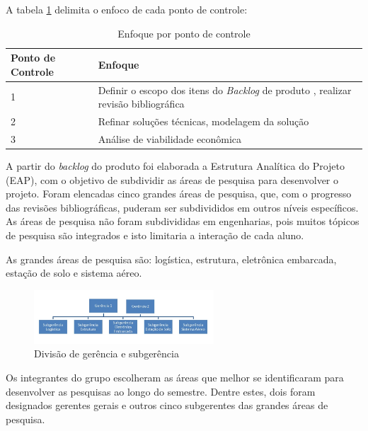   A tabela \ref{tab:enfoque_pc} delimita o enfoco de cada ponto de controle:

  \begin{table}[H]
  \centering
  \begin{tabular}{|p{4cm}|p{12cm}|}
  \hline
  Ponto de Controle & Enfoque                                                                                      \\ \hline
  1                 & Definir o escopo dos itens do \textit{Backlog} de produto , realizar revisão bibliográfica \\ \hline
  2                 & Refinar soluções técnicas, modelagem da solução                                              \\ \hline
  3                 & Análise de viabilidade econômica                                                             \\ \hline
  \end{tabular}
  \caption{Enfoque por ponto de controle}
  \label{tab:enfoque_pc}
  \end{table}

	A partir do \emph{backlog} do produto foi elaborada a Estrutura Analítica do Projeto (EAP), com o objetivo de subdividir as áreas de pesquisa para desenvolver o projeto. Foram elencadas cinco grandes áreas de pesquisa, que, com o progresso das revisões bibliográficas, puderam ser subdivididos em outros níveis específicos. As áreas de pesquisa não foram subdivididas em engenharias, pois muitos tópicos de pesquisa são integrados e isto limitaria a interação de cada aluno.

	As grandes áreas de pesquisa são: logística, estrutura, eletrônica embarcada, estação de solo e sistema aéreo.

  \begin{figure}[H]
  	\centering
  	\includegraphics[width=0.6\textwidth]{figuras/eap}
  	\caption{Divisão de gerência e subgerência}
  	\label{img:eap}
  \end{figure}

  Os integrantes do grupo escolheram as áreas que melhor se identificaram para desenvolver as pesquisas ao longo do semestre. Dentre estes, dois foram designados gerentes gerais e outros cinco subgerentes das grandes áreas de pesquisa.

